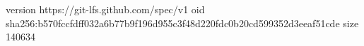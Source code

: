 version https://git-lfs.github.com/spec/v1
oid sha256:b570fccfdff032a6b77b9f196d955c3f48d220fdc0b20cd599352d3eeaf51cde
size 140634
